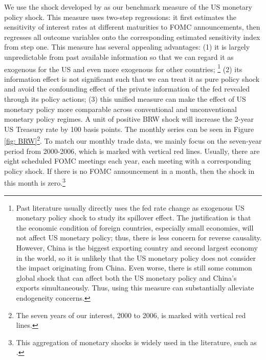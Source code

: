 We use the shock developed by \cite{bu2021unified} as our benchmark measure of the US monetary policy shock. This measure uses \cite{fama1973risk} two-step regressions: it first estimates the sensitivity of interest rates at different maturities to FOMC announcements, then regresses all outcome variables onto the corresponding estimated sensitivity index from step one. This measure has several appealing advantages: (1) it is largely unpredictable from past available information so that we can regard it as exogenous for the US and even more exogenous for other countries; \footnote{Past literature usually directly uses the fed rate change as exogenous US monetary policy shock to study its spillover effect. The justification is that the economic condition of foreign countries, especially small economies, will not affect US monetary policy; thus, there is less concern for reverse causality. However, China is the biggest exporting country and second largest economy in the world, so it is unlikely that the US monetary policy does not consider the impact originating from China. Even worse, there is still some common global shock that can affect both the US monetary policy and China's exports simultaneously. Thus, using this measure can substantially alleviate endogeneity concerns.} (2) its information effect is not significant such that we can treat it as pure policy shock and avoid the confounding effect of the private information of the fed revealed through its policy actions; (3) this unified measure can make the effect of US monetary policy more comparable across conventional and unconventional monetary policy regimes. A unit of positive BRW shock will increase the 2-year US Treasury rate by 100 basis points. The monthly series can be seen in Figure \ref{fig: BRW}\footnote{The seven years of our interest, 2000 to 2006, is marked with vertical red lines.}. To match our monthly trade data, we mainly focus on the seven-year period from 2000-2006, which is marked with vertical red lines. Usually, there are eight scheduled FOMC meetings each year, each meeting with a corresponding policy shock. If there is no FOMC announcement in a month, then the shock in this month is zero.\footnote{This aggregation of monetary shocks is widely used in the literature, such as \cite{chari2021Taper}.}

